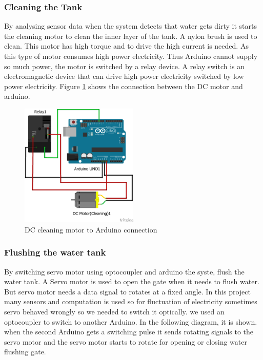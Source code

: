 \subsubsection{Cleaning the Tank}
By analysing sensor data when the system detects that water gets dirty it starts the cleaning motor to clean the inner layer of the tank. A nylon brush is used to clean. This motor has high torque and to drive the high current is needed. As this type of motor consumes high power electricity. Thus Arduino cannot supply so much power, the motor is switched by a relay device. A relay switch is an electromagnetic device that can drive high power electricity switched by low power electricity. Figure \ref{DCMotor} shows the connection between the DC motor and arduino.
\begin{figure}[H]
\centering
\includegraphics[width=0.5\textwidth]{figures/Motor_bb.png}
\caption{DC cleaning motor to Arduino connection}
\label{DCMotor}
\end{figure}
\subsubsection{Flushing the water tank}
By switching servo motor using optocoupler and arduino the syste, flush the water tank.
A Servo motor is used to open the gate when it needs to flush water. But servo motor needs a data signal to rotates at a fixed angle. In this project many sensors and computation is used so for fluctuation of electricity sometimes servo behaved wrongly so we needed to switch it optically. we used an optocoupler to switch to another Arduino. In the following diagram, it is shown. when the second Arduino gets a switching pulse it sends rotating signals to the servo motor and the servo motor starts to rotate for opening or closing water flushing gate.

